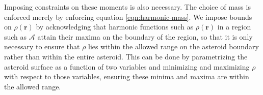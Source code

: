 Imposing constraints on these moments is also necessary. The choice of mass is enforced merely by enforcing equation \ref{eqn:harmonic-mass}. We impose bounds on $\rho(\bm r)$ by acknowledging that harmonic functions such as $\rho(\bm r)$ in a region such as $\mathcal{A}$ attain their maxima on the boundary of the region, so that it is only necessary to ensure that $\rho$ lies within the allowed range on the asteroid boundary rather than within the entire asteroid. This can be done by parametrizing the asteroid surface as a function of two variables and minimizing and maximizing $\rho$ with respect to those variables, ensuring these minima and maxima are within the allowed range.








